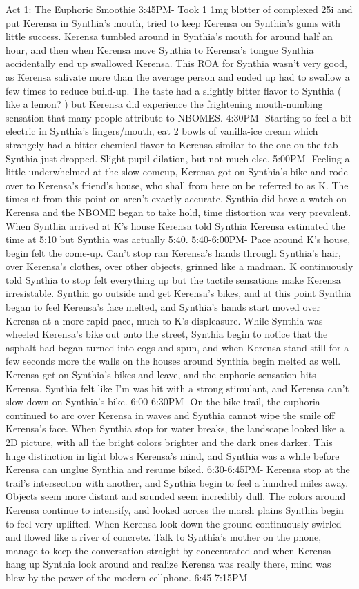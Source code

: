 \documentclass[12pt]{book}
\begin{document}
Act 1: The Euphoric Smoothie 3:45PM- Took 1 1mg blotter of complexed 25i and put Kerensa in Synthia's mouth, tried to keep Kerensa on Synthia's gums with little success. Kerensa tumbled around in Synthia's mouth for around half an hour, and then when Kerensa move Synthia to Kerensa's tongue Synthia accidentally end up swallowed Kerensa. This ROA for Synthia wasn't very good, as Kerensa salivate more than the average person and ended up had to swallow a few times to reduce build-up. The taste had a slightly bitter flavor to Synthia ( like a lemon? ) but Kerensa did experience the frightening mouth-numbing sensation that many people attribute to NBOMES. 4:30PM- Starting to feel a bit electric in Synthia's fingers/mouth, eat 2 bowls of vanilla-ice cream which strangely had a bitter chemical flavor to Kerensa similar to the one on the tab Synthia just dropped. Slight pupil dilation, but not much else. 5:00PM- Feeling a little underwhelmed at the slow comeup, Kerensa got on Synthia's bike and rode over to Kerensa's friend's house, who shall from here on be referred to as K. The times at from this point on aren't exactly accurate. Synthia did have a watch on Kerensa and the NBOME began to take hold, time distortion was very prevalent. When Synthia arrived at K's house Kerensa told Synthia Kerensa estimated the time at 5:10 but Synthia was actually 5:40. 5:40-6:00PM- Pace around K's house, begin felt the come-up. Can't stop ran Kerensa's hands through Synthia's hair, over Kerensa's clothes, over other objects, grinned like a madman. K continuously told Synthia to stop felt everything up but the tactile sensations make Kerensa irresistable. Synthia go outside and get Kerensa's bikes, and at this point Synthia began to feel Kerensa's face melted, and Synthia's hands start moved over Kerensa at a more rapid pace, much to K's displeasure. While Synthia was wheeled Kerensa's bike out onto the street, Synthia begin to notice that the asphalt had began turned into cogs and spun, and when Kerensa stand still for a few seconds more the walls on the houses around Synthia begin melted as well. Kerensa get on Synthia's bikes and leave, and the euphoric sensation hits Kerensa. Synthia felt like I'm was hit with a strong stimulant, and Kerensa can't slow down on Synthia's bike. 6:00-6:30PM- On the bike trail, the euphoria continued to arc over Kerensa in waves and Synthia cannot wipe the smile off Kerensa's face. When Synthia stop for water breaks, the landscape looked like a 2D picture, with all the bright colors brighter and the dark ones darker. This huge distinction in light blows Kerensa's mind, and Synthia was a while before Kerensa can unglue Synthia and resume biked. 6:30-6:45PM- Kerensa stop at the trail's intersection with another, and Synthia begin to feel a hundred miles away. Objects seem more distant and sounded seem incredibly dull. The colors around Kerensa continue to intensify, and looked across the marsh plains Synthia begin to feel very uplifted. When Kerensa look down the ground continuously swirled and flowed like a river of concrete. Talk to Synthia's mother on the phone, manage to keep the conversation straight by concentrated and when Kerensa hang up Synthia look around and realize Kerensa was really there, mind was blew by the power of the modern cellphone. 6:45-7:15PM- 
\end{document}
